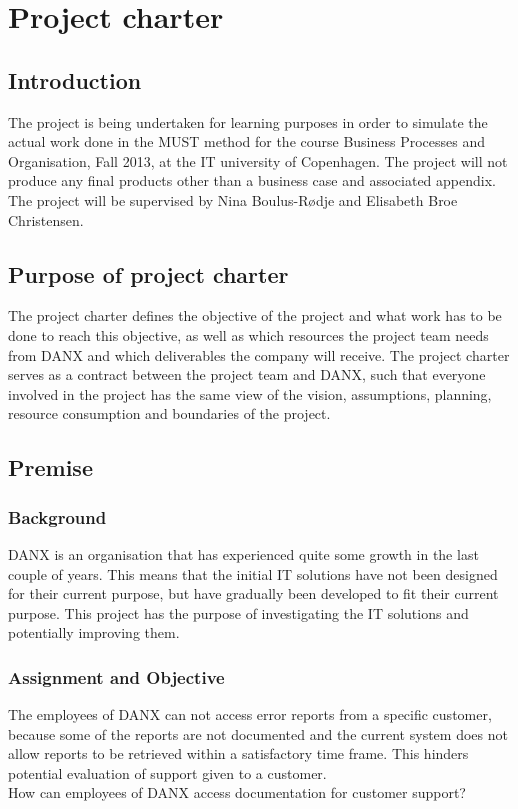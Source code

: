 \chapter{Project charter}

\section{Introduction}
The project is being undertaken for learning purposes in order to simulate the actual work done in the MUST method for the course Business Processes and Organisation, Fall 2013, at the IT university of Copenhagen. The project will not produce any final products other than a business case and associated appendix. The project will be supervised by Nina Boulus-Rødje and Elisabeth Broe Christensen.

\section{Purpose of project charter}
The project charter defines the objective of the project and what work has to be done to reach this objective, as well as which resources the project team needs from DANX and which deliverables the company will receive. The project charter serves as a contract between the project team and DANX, such that everyone involved in the project has the same view of the vision, assumptions, planning, resource consumption and boundaries of the project.

\section{Premise}
\subsection{Background}
DANX is an organisation that has experienced quite some growth in the last couple of years. This means that the initial IT solutions have not been designed for their current purpose, but have gradually been developed to fit their current purpose.
This project has the purpose of investigating the IT solutions and potentially improving them. 


\subsection{Assignment and Objective}
The employees of DANX can not access error reports from a specific customer, because some of the reports are not documented and the current system does not allow reports to be retrieved within a satisfactory time frame. This hinders potential evaluation of support given to a customer.\\
How can employees of DANX access documentation for customer support?

